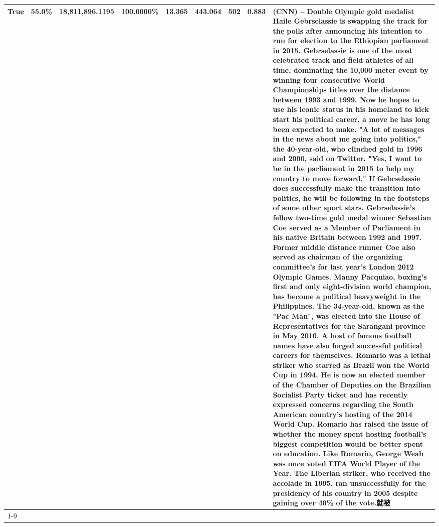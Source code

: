 \begin{table}[H]
{\begin{tabular}{lllrlllll}
True & 55.0\% & 18,811,896.1195 & \bfseries \color{red} 100.0000\% & 13.365 & 443.064 & 502 & 0.883 & (CNN) -- Double Olympic gold medalist Haile Gebrselassie is swapping the track for the polls after announcing his intention to run for election to the Ethiopian parliament in 2015. Gebrselassie is one of the most celebrated track and field athletes of all time, dominating the 10,000 meter event by winning four consecutive World Championships titles over the distance between 1993 and 1999. Now he hopes to use his iconic status in his homeland to kick start his political career, a move he has long been expected to make. "A lot of messages in the news about me going into politics," the 40-year-old, who clinched gold in 1996 and 2000, said on Twitter. "Yes, I want to be in the parliament in 2015 to help my country to move forward." If Gebrselassie does successfully make the transition into politics, he will be following in the footsteps of some other sport stars. Gebrselassie's fellow two-time gold medal winner Sebastian Coe served as a Member of Parliament in his native Britain between 1992 and 1997. Former middle distance runner Coe also served as chairman of the organizing committee's for last year's London 2012 Olympic Games. Manny Pacquiao, boxing's first and only eight-division world champion, has become a political heavyweight in the Philippines. The 34-year-old, known as the "Pac Man", was elected into the House of Representatives for the Sarangani province in May 2010. A host of famous football names have also forged successful political careers for themselves. Romario was a lethal striker who starred as Brazil won the World Cup in 1994. He is now an elected member of the Chamber of Deputies on the Brazilian Socialist Party ticket and has recently expressed concerns regarding the South American country's hosting of the 2014 World Cup. Romario has raised the issue of whether the money spent hosting football's biggest competition would be better spent on education. Like Romario, George Weah was once voted FIFA World Player of the Year. The Liberian striker, who received the accolade in 1995, ran unsuccessfully for the presidency of his country in 2005 despite gaining over 40\% of the vote.就被 \\
\cline{1-9}

\end{tabular}}
\end{table}
